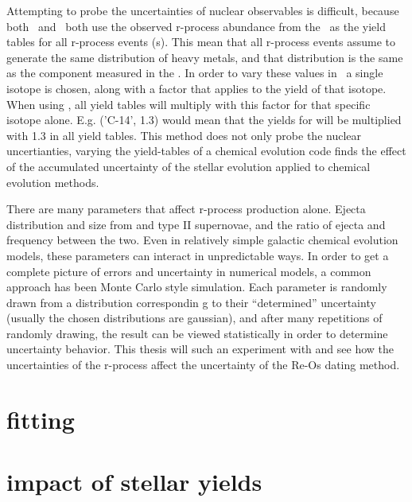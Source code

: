 Attempting to probe the uncertainties of nuclear observables is difficult, because both \eris\ and \omegamodel\ both use the observed r-process abundance from the \sos\ as the yield tables for all r-process events (\nsm\-s). This mean that all r-process events assume to generate the same distribution of heavy metals, and that distribution is the same as the component measured in the \sos.
In order to vary these values in \omegamodel\ a single isotope is chosen, along with a factor that applies to the yield of that isotope. When using \omegamodel, all yield tables will multiply with this factor for that specific isotope alone. E.g. ('C-14', 1.3) would mean that the yields for  will be multiplied with 1.3 in all yield tables.
This method does not only probe the nuclear uncertianties, varying the yield-tables of a chemical evolution code finds the effect of the accumulated uncertainty of the stellar evolution applied to chemical evolution methods.

There are many parameters that affect r-process production alone. Ejecta distribution and size from \nsm and type II supernovae, and the ratio of ejecta and frequency between the two. Even in relatively simple galactic chemical evolution models, these parameters can interact in unpredictable ways. In order to get a complete picture of errors and uncertainty in numerical models, a common approach has been Monte Carlo style simulation. Each parameter is randomly drawn from a distribution correspondin g to their ``determined'' uncertainty (usually the chosen distributions are gaussian), and after many repetitions of randomly drawing, the result can be viewed statistically in order to determine uncertainty behavior.
This thesis will such an experiment with  and see how the uncertainties of the r-process affect the uncertainty of the Re-Os dating method.

\section{fitting}

\section{impact of stellar yields}


\fi
